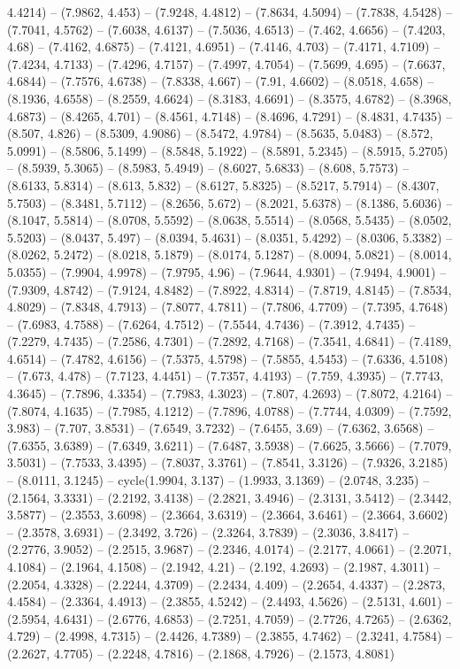 4.4214) -- (7.9862, 4.453) -- (7.9248, 4.4812) -- (7.8634, 4.5094) -- (7.7838, 4.5428) -- (7.7041, 4.5762) -- (7.6038, 4.6137) -- (7.5036, 4.6513) -- (7.462, 4.6656) -- (7.4203, 4.68) -- (7.4162, 4.6875) -- (7.4121, 4.6951) -- (7.4146, 4.703) -- (7.4171, 4.7109) -- (7.4234, 4.7133) -- (7.4296, 4.7157) -- (7.4997, 4.7054) -- (7.5699, 4.695) -- (7.6637, 4.6844) -- (7.7576, 4.6738) -- (7.8338, 4.667) -- (7.91, 4.6602) -- (8.0518, 4.658) -- (8.1936, 4.6558) -- (8.2559, 4.6624) -- (8.3183, 4.6691) -- (8.3575, 4.6782) -- (8.3968, 4.6873) -- (8.4265, 4.701) -- (8.4561, 4.7148) -- (8.4696, 4.7291) -- (8.4831, 4.7435) -- (8.507, 4.826) -- (8.5309, 4.9086) -- (8.5472, 4.9784) -- (8.5635, 5.0483) -- (8.572, 5.0991) -- (8.5806, 5.1499) -- (8.5848, 5.1922) -- (8.5891, 5.2345) -- (8.5915, 5.2705) -- (8.5939, 5.3065) -- (8.5983, 5.4949) -- (8.6027, 5.6833) -- (8.608, 5.7573) -- (8.6133, 5.8314) -- (8.613, 5.832) -- (8.6127, 5.8325) -- (8.5217, 5.7914) -- (8.4307, 5.7503) -- (8.3481, 5.7112) -- (8.2656, 5.672) -- (8.2021, 5.6378) -- (8.1386, 5.6036) -- (8.1047, 5.5814) -- (8.0708, 5.5592) -- (8.0638, 5.5514) -- (8.0568, 5.5435) -- (8.0502, 5.5203) -- (8.0437, 5.497) -- (8.0394, 5.4631) -- (8.0351, 5.4292) -- (8.0306, 5.3382) -- (8.0262, 5.2472) -- (8.0218, 5.1879) -- (8.0174, 5.1287) -- (8.0094, 5.0821) -- (8.0014, 5.0355) -- (7.9904, 4.9978) -- (7.9795, 4.96) -- (7.9644, 4.9301) -- (7.9494, 4.9001) -- (7.9309, 4.8742) -- (7.9124, 4.8482) -- (7.8922, 4.8314) -- (7.8719, 4.8145) -- (7.8534, 4.8029) -- (7.8348, 4.7913) -- (7.8077, 4.7811) -- (7.7806, 4.7709) -- (7.7395, 4.7648) -- (7.6983, 4.7588) -- (7.6264, 4.7512) -- (7.5544, 4.7436) -- (7.3912, 4.7435) -- (7.2279, 4.7435) -- (7.2586, 4.7301) -- (7.2892, 4.7168) -- (7.3541, 4.6841) -- (7.4189, 4.6514) -- (7.4782, 4.6156) -- (7.5375, 4.5798) -- (7.5855, 4.5453) -- (7.6336, 4.5108) -- (7.673, 4.478) -- (7.7123, 4.4451) -- (7.7357, 4.4193) -- (7.759, 4.3935) -- (7.7743, 4.3645) -- (7.7896, 4.3354) -- (7.7983, 4.3023) -- (7.807, 4.2693) -- (7.8072, 4.2164) -- (7.8074, 4.1635) -- (7.7985, 4.1212) -- (7.7896, 4.0788) -- (7.7744, 4.0309) -- (7.7592, 3.983) -- (7.707, 3.8531) -- (7.6549, 3.7232) -- (7.6455, 3.69) -- (7.6362, 3.6568) -- (7.6355, 3.6389) -- (7.6349, 3.6211) -- (7.6487, 3.5938) -- (7.6625, 3.5666) -- (7.7079, 3.5031) -- (7.7533, 3.4395) -- (7.8037, 3.3761) -- (7.8541, 3.3126) -- (7.9326, 3.2185) -- (8.0111, 3.1245) -- cycle(1.9904, 3.137) -- (1.9933, 3.1369) -- (2.0748, 3.235) -- (2.1564, 3.3331) -- (2.2192, 3.4138) -- (2.2821, 3.4946) -- (2.3131, 3.5412) -- (2.3442, 3.5877) -- (2.3553, 3.6098) -- (2.3664, 3.6319) -- (2.3664, 3.6461) -- (2.3664, 3.6602) -- (2.3578, 3.6931) -- (2.3492, 3.726) -- (2.3264, 3.7839) -- (2.3036, 3.8417) -- (2.2776, 3.9052) -- (2.2515, 3.9687) -- (2.2346, 4.0174) -- (2.2177, 4.0661) -- (2.2071, 4.1084) -- (2.1964, 4.1508) -- (2.1942, 4.21) -- (2.192, 4.2693) -- (2.1987, 4.3011) -- (2.2054, 4.3328) -- (2.2244, 4.3709) -- (2.2434, 4.409) -- (2.2654, 4.4337) -- (2.2873, 4.4584) -- (2.3364, 4.4913) -- (2.3855, 4.5242) -- (2.4493, 4.5626) -- (2.5131, 4.601) -- (2.5954, 4.6431) -- (2.6776, 4.6853) -- (2.7251, 4.7059) -- (2.7726, 4.7265) -- (2.6362, 4.729) -- (2.4998, 4.7315) -- (2.4426, 4.7389) -- (2.3855, 4.7462) -- (2.3241, 4.7584) -- (2.2627, 4.7705) -- (2.2248, 4.7816) -- (2.1868, 4.7926) -- (2.1573, 4.8081) 